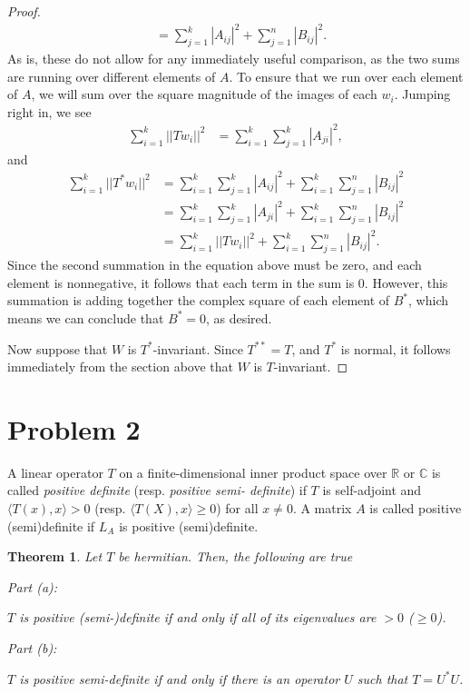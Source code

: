 \documentclass[10pt,a4paper]{article}
\makeatletter
\newtheorem{theorem}{Theorem}
\newcommand{\proofpart}[2]{%
  \par
  \addvspace{\medskipamount}%
  \noindent\emph{Part #1: #2}\par\nobreak
  \addvspace{\smallskipamount}%
  \@afterheading
}
\theoremstyle{definition}
\newcommand{\R}{\mathbb{R}}
\newcommand{\C}{\mathbb{C}}
\makeatother
\begin{document}
\begin{proof}
\begin{align*}
&= \sum_{j = 1}^k |A_{ij}|^2 + \sum_{j = 1}^n |B_{ij}|^2.
\end{align*}
As is, these do not allow for any immediately useful comparison, as the two sums are running over different elements of $A$. To ensure that we run over each element of $A$, we will sum over the square magnitude of the images of each $w_i$. Jumping right in, we see
\begin{align*}
\sum_{i=1}^k ||Tw_i||^2 &= \sum_{i=1}^k \sum_{j = 1}^k |A_{ji}|^2,
\end{align*}
and 
\begin{align*}
\sum_{i=1}^k ||T^*w_i||^2 &= \sum_{i=1}^k\sum_{j = 1}^k |A_{ij}|^2  + \sum_{i=1}^k \sum_{j = 1}^n |B_{ij}|^2 \\
&= \sum_{i=1}^k\sum_{j = 1}^k |A_{ji}|^2  + \sum_{i=1}^k \sum_{j = 1}^n |B_{ij}|^2 \\
&= \sum_{i=1}^k ||Tw_i||^2 + \sum_{i=1}^k \sum_{j = 1}^n |B_{ij}|^2.
\end{align*}
Since the second summation in the equation above must be zero, and each element is nonnegative, it follows that each term in the sum is 0. However, this summation is adding together the complex square of each element of $B^*$, which means we can conclude that $B^* = 0$, as desired.

Now suppose that $W$ is $T^*$-invariant. Since $T^{**} = T$, and $T^*$ is normal, it follows immediately from the section above that $W$ is $T$-invariant.
\end{proof}

\section*{Problem 2}
A linear operator $T$ on a finite-dimensional inner product space over $\R$
or $\C$ is called \textit{positive definite} (resp. \textit{positive semi-
definite}) if $T$ is self-adjoint and $\langle T(x), x \rangle > 0$ (resp. $\langle
T(X), x \rangle \geq 0$) for all $x \neq 0$. A matrix $A$ is called positive
(semi)definite if $L_A$ is positive (semi)definite.

\begin{theorem}
Let $T$ be hermitian. Then, the following are true
\proofpart{(a)}{} $T$ is positive (semi-)definite if and only if all of its
eigenvalues are $>0$ ($\geq 0$).
\proofpart{(b)}{} $T$ is positive semi-definite if and only if there is an
operator $U$ such that $T = U^* U$.
\end{theorem}
\end{document}
